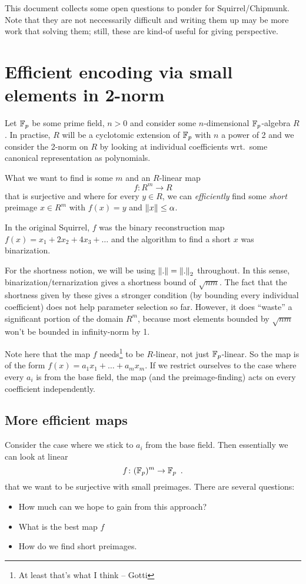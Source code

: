 \documentclass{article}
\begin{document}
This document collects some open questions to ponder for Squirrel/Chipmunk. Note that they are not neccessarily difficult and writing them up may be more work that solving them;
still, these are kind-of useful for giving perspective.

\section{Efficient encoding via small elements in 2-norm}

Let ${\mathbb{F}}_p$ be some prime field, $n>0$ and consider some $n$-dimensional ${\mathbb{F}}_p$-algebra $R$. In practise, $R$ will be a cyclotomic extension of ${\mathbb{F}}_p$ with $n$ a power of 2 and we consider the 2-norm on $R$ by looking at individual coefficients wrt.\ some canonical representation as polynomials.

What we want to find is some $m$ and an $R$-linear map
\[
 f\colon R^m \to R
\]
that is surjective and where for every $y\in R$, we can \emph{efficiently} find some \emph{short} preimage $x\in R^m$ with $f(x) = y$ and ${\lVert{x}\rVert}\leq \alpha$.

In the original Squirrel, $f$ was the binary reconstruction map $f(x) = x_1 + 2x_2 + 4x_3+ \ldots$ and the algorithm to find a short $x$ was binarization.

For the shortness notion, we will be using ${\lVert{.}\rVert} = {\lVert{.}\rVert}_2$ throughout. In this sense, binarization/ternarization gives a shortness bound of $\sqrt{nm}$.
The fact that the shortness given by these gives a stronger condition (by bounding every individual coefficient) does not help parameter selection so far.
However, it does ``waste'' a significant portion of the domain $R^m$, because most elements bounded by $\sqrt{nm}$ won't be bounded in infinity-norm by 1.

Note here that the map $f$ needs\footnote{At least that's what I think -- Gotti} to be $R$-linear, not just ${\mathbb{F}}_p$-linear. So the map is of the form $f(x) = a_1 x_1 + \ldots + a_m x_m$.
If we restrict ourselves to the case where every $a_i$ is from the base field, the map (and the preimage-finding) acts on every coefficient independently.

\subsection{More efficient maps}
Consider the case where we stick to $a_i$ from the base field. Then essentially we can look at linear
\[
    f\colon ({\mathbb{F}}_p)^m \to {\mathbb{F}}_p\enspace.
\]
that we want to be surjective with small preimages. There are several questions:
\begin{itemize}
 \item How much can we hope to gain from this approach?
 \item What is the best map $f$
 \item How do we find short preimages.
\end{itemize}
\end{document}
